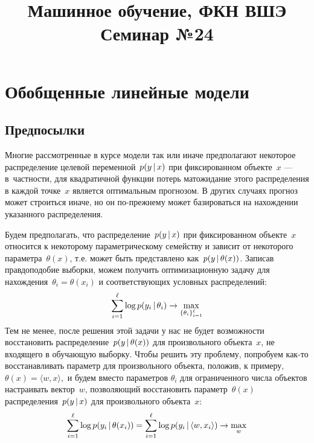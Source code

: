 \documentclass[12pt,a4paper]{article}
\title{Машинное обучение, ФКН ВШЭ\\Семинар №24}
\begin{document}
\author{}
\date{}
\maketitle

\section{Обобщенные линейные модели}
    \subsection{Предпосылки}
    \par Многие рассмотренные в курсе модели так или иначе предполагают некоторое распределение целевой переменной~$p(y \mspace{3mu}{|}\mspace{3mu} x)$ при фиксированном объекте~$x$ — в~частности, для квадратичной функции потерь матожидание этого распределения в каждой точке~$x$ является оптимальным прогнозом. В других случаях прогноз может строиться иначе, но он по-прежнему может базироваться на нахождении указанного распределения.
    \par Будем предполагать, что распределение~$p(y \mspace{3mu}{|}\mspace{3mu} x)$ при фиксированном объекте~$x$ относится к некоторому параметрическому семейству и зависит от некоторого параметра~$\theta(x)$, т.е. может быть представлено как~$p(y \mspace{3mu}{|}\mspace{3mu} \theta(x))$. Записав правдоподобие выборки, можем получить оптимизационную задачу для нахождения~$\theta_i = \theta(x_i)$ и соответствующих условных распределений:
    \begin{equation}
        \sum_{i=1}^\ell \log p(y_i \mspace{3mu}{|}\mspace{3mu} \theta_i) \to \max_{\{\theta_i\}_{i=1}^\ell}
    \end{equation}
    Тем не менее, после решения этой задачи у нас не будет возможности восстановить распределение~$p(y \mspace{3mu}{|}\mspace{3mu} \theta(x))$ для произвольного объекта~$x$, не входящего в обучающую выборку. Чтобы решить эту проблему, попробуем как-то восстанавливать параметр для произвольного объекта, положив, к примеру, $\theta(x) = \langle w, x \rangle,$ и будем вместо параметров $\theta_i$ для ограниченного числа объектов настраивать вектор~$w$, позволяющий восстановить параметр~$\theta(x)$ распределения~$p(y \mspace{3mu}{|}\mspace{3mu} x)$ для произвольного объекта~$x$:
    \begin{equation}
        \sum_{i=1}^\ell \log p(y_i \mspace{3mu}{|}\mspace{3mu} \theta(x_i)) = \sum_{i=1}^\ell \log p(y_i \mspace{3mu}{|}\mspace{3mu} \langle w, x_i \rangle) \to \max_{w}
    \end{equation}
    
\end{document}

